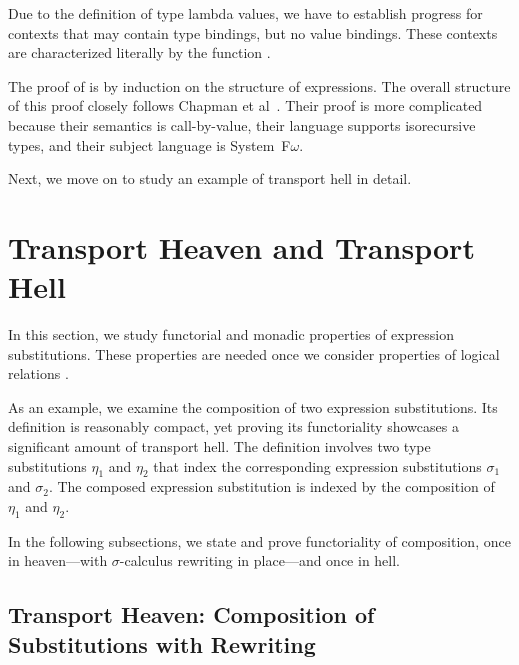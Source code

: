 \documentclass[manuscript,screen,review,anonymous,acmsmall]{acmart}
\begin{document}
Due to the definition of type lambda values, we have to establish progress for
contexts that may contain type bindings, but no value bindings. These contexts are
characterized literally by the function .

The proof of
 is by induction on the structure of expressions. The overall
structure of this proof closely follows Chapman et
al~\cite{10.1007/978-3-030-33636-3_10}. Their proof is more
complicated because their semantics is call-by-value, their language supports
isorecursive types, and their subject language is System~F$\omega$.

Next, we move on to study an example of transport hell in detail.

\section{Transport Heaven and Transport Hell}
\label{sec:laws-renam-subst}




In this section, we study functorial and monadic properties of expression
substitutions. These properties are needed once we consider properties of logical relations
\cite{10.1145/3678000.3678201}. 

As an example, we examine the composition of two expression
substitutions. Its definition is reasonably compact, yet proving its
functoriality showcases a significant amount of transport hell.
The definition involves two type substitutions $\eta_1$ and $\eta_2$ that
index the corresponding expression substitutions $\sigma_1$ and
$\sigma_2$. The composed expression substitution is indexed by the
composition of $\eta_1$ and $\eta_2$.
\SFExprSubCompDefinition

In the following subsections, we state and prove functoriality of
composition, once in heaven---with $\sigma$-calculus rewriting in
place---and once in hell.

\subsection{Transport Heaven: Composition of Substitutions with Rewriting}
\label{sec:comp-subst-with}
\end{document}
